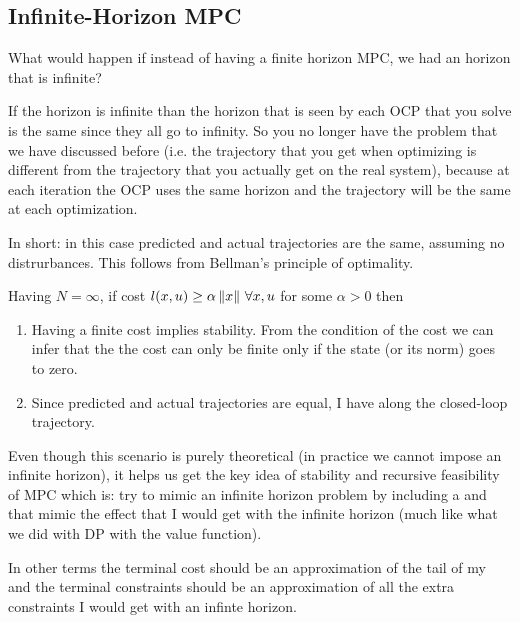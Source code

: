 \subsection{Infinite-Horizon MPC}
What would happen if instead of having a finite horizon MPC, we had an horizon that is infinite?

If the horizon is infinite than the horizon that is seen by each OCP that you solve is the same since they all go to infinity. So you no longer have the problem that we have discussed before (i.e. the trajectory that you get when optimizing is different from the trajectory that you actually get on the real system), because at each iteration the OCP uses the same horizon and the trajectory will be the same at each optimization.

In short: in this case predicted and actual trajectories are the same, assuming no distrurbances.
This follows from Bellman's principle of optimality.

Having $N=\infty$, if cost $l(x,u) \ge \alpha\,\lVert x\rVert\,\,\forall x,u$ for some $\alpha>0$ then 
\begin{enumerate}
\item Having a finite cost implies stability. From the condition of the cost we can infer that the the cost can only be finite only if the state (or its norm) goes to zero. 
\item Since predicted and actual trajectories are equal, I have  along the closed-loop trajectory.
\end{enumerate}

Even though this scenario is purely theoretical (in practice we cannot impose an infinite horizon), it helps us get the key idea of stability and recursive feasibility of MPC which is: try to mimic an infinite horizon problem by including a  and  that mimic the effect that I would get with the infinite horizon (much like what we did with DP with the value function).

In other terms the terminal cost should be an approximation of the tail of my  and the terminal constraints should be an approximation of all the extra constraints I would get with an infinte horizon.

